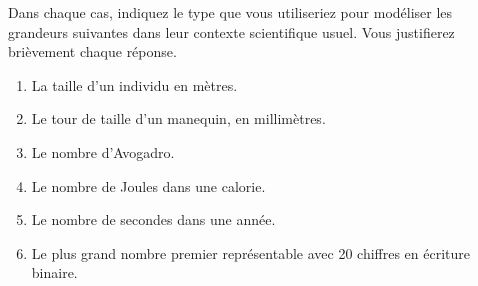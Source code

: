 \question Dans chaque cas, indiquez le type que vous utiliseriez pour modéliser les grandeurs suivantes dans leur contexte scientifique usuel.
Vous justifierez brièvement chaque réponse. 

\begin{enumerate}[label=\emph{\alph*)}]
  \item La taille d'un individu en mètres. 
  \item Le tour de taille d'un manequin, en millimètres.
  \item Le nombre d'Avogadro.
  \item Le nombre de Joules dans une calorie.
  \item Le nombre de secondes dans une année.
  \item Le plus grand nombre premier représentable avec 20 chiffres en écriture binaire.
\end{enumerate}